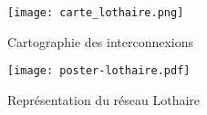 \begin{figure}[H]
    \center
    \texttt{[image: carte\_lothaire.png]}
    \label{fig:imagereseaulothaire1}
    \caption{Cartographie des interconnexions}
\end{figure}
\begin{figure}[H]
    \center
    \texttt{[image: poster-lothaire.pdf]}
    \label{fig:imagereseaulothaire2}
    \caption{Représentation du réseau Lothaire}
\end{figure}

